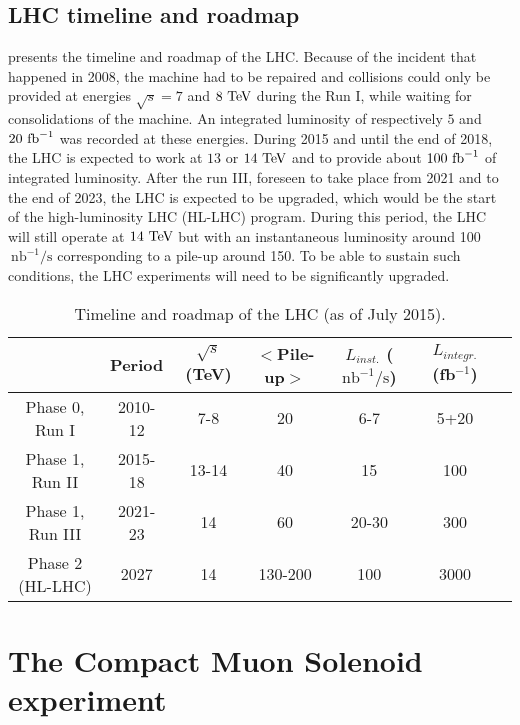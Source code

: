     \subsection{LHC timeline and roadmap}

     presents the timeline and roadmap of the LHC.
    Because of the incident that happened in 2008, the machine had to be
    repaired and collisions could only be provided at energies $\sqrt{s} = 7$
    and $8~\text{TeV}$ during the Run I, while waiting for consolidations of the
    machine. An integrated luminosity of respectively $5$ and $20~\text{fb}^{-1}$ was
    recorded at these energies. During 2015 and until the end of 2018, the LHC
    is expected to work at $13$ or $14~\text{TeV}$ and to provide about $100~\text{fb}^{-1}$ of
    integrated luminosity. After the run III, foreseen to take place from 2021
    and to the end of 2023, the LHC is expected to be upgraded, which would be
    the start of the high-luminosity LHC (HL-LHC) program. During this period,
    the LHC will still operate at $14~\text{TeV}$ but with an instantaneous luminosity
    around 100$~\text{nb}^{-1} / \text{s}$ corresponding to a pile-up around
    150. To be able to sustain such conditions, the LHC experiments will need to
    be significantly upgraded.

    \begin{table}[h]
        \begin{tabular}{|c|c|c|c|c|c|c|}
            \hline
            & Period
            & $\sqrt{s}$ (TeV)
            & $<$Pile-up$>$
            & $L_{inst.}$ ($\text{nb}^{-1} / \text{s}$)
            & $L_{integr.}$ (fb$^{-1}$) \\
            \hline
            Phase 0, Run I    & 2010-12 & 7-8   & 20      & 6-7   & 5+20\\
            \hline
            \hline
            Phase 1, Run II   & 2015-18 & 13-14 & 40      & 15    & 100\\
            Phase 1, Run III  & 2021-23 & 14    & 60      & 20-30 & 300\\
            \hline
            \hline
            Phase 2 (HL-LHC)  & 2027    & 14    & 130-200 & 100   & 3000\\
            \hline
        \end{tabular}
        \caption{Timeline and roadmap of the LHC (as of July 2015).\label{tab:LHCtimeline}}
    \end{table}

    \section{The Compact Muon Solenoid experiment \label{sec:CMSexperiment}}

